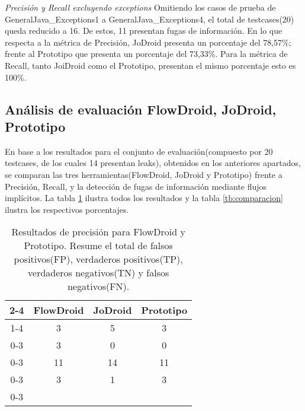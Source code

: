 \textit{Precisión y Recall excluyendo exceptions}\newline
Omitiendo los casos de prueba de GeneralJava\_Exceptions1 a
GeneralJava\_Exceptions4, el total de testcases(20) queda reducido a 16. De
estos, 11 presentan fugas de información.\newline
En lo que respecta a la métrica de Precisión, JoDroid
presenta un porcentaje del 78,57\%; frente al Prototipo que presenta un
porcentaje del 73,33\%.\newline 
Para la métrica de Recall, tanto JoiDroid como el Prototipo, presentan el mismo
porcentaje esto es 100\%.\newline



\subsection{Análisis de evaluación FlowDroid, JoDroid, Prototipo}
\label{subsec:fjp}

En base a los resultados para el conjunto de
evaluación(compuesto por 20 testcases, de los cuales 14 presentan leaks),
obtenidos en los anteriores apartados, 
se comparan las tres herramientas(FlowDroid, JoDroid y Prototipo) frente a
Precisión, Recall, y la detección de fugas de información mediante flujos
implícitos. La tabla \ref{tb:porcentajes} ilustra todos los resultados y la
tabla \ref{tb:comparacion} ilustra los respectivos porcentajes.

\begin{table}[t!]
\begin{center}
\begin{tabular}{c|c|c|c|}
\cline{2-4}
& \cellcolor{gray!30}FlowDroid & \cellcolor{gray!30}JoDroid &
\cellcolor{gray!30}Prototipo \\
\cline{1-4}
\multicolumn{0}{ |c|  }{\multirow{0}{*}{FP} }  & 3 & 5 & 3\\ \cline{0-3}
\multicolumn{0}{ |c|  }{\multirow{0}{*}{FN} }  & 3 & 0 & 0\\ \cline{0-3}
\multicolumn{0}{ |c|  }{\multirow{0}{*}{TP} }  & 11 & 14 & 11\\\cline{0-3}
\multicolumn{0}{ |c|  }{\multirow{0}{*}{TN} }  & 3 & 1 &  3\\ \cline{0-3}
\end{tabular}
\end{center}
\caption{Resultados de precisión para FlowDroid y Prototipo. Resume el total de
falsos positivos(FP), verdaderos positivos(TP), verdaderos negativos(TN) y
falsos negativos(FN).}
\label{tb:porcentajes}
\end{table}

